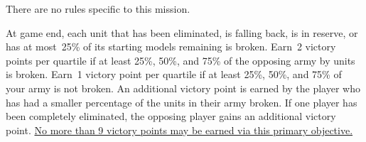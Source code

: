 

\begin{tablesetup}    
  \hammerandanvil
\end{tablesetup}

\begin{missionrules}

\bigskip
There are no rules specific to this mission.

\end{missionrules}


\begin{scoring}
  
\begin{primaries}
  At game end, each unit that has been eliminated, is falling back, is
  in reserve, or has at most~25\% of its starting models remaining is
  broken.  Earn~2 victory points per quartile if at least 25\%, 50\%,
  and 75\% of the opposing army by units is broken.  Earn~1 victory
  point per quartile if at least 25\%, 50\%, and 75\% of your army is
  not broken.  An additional victory point is earned by the player who
  has had a smaller percentage of the units in their army broken.  If
  one player has been completely eliminated, the opposing player gains
  an additional victory point.  \underline{No more than 9 victory
    points may be earned via this primary objective.}
\end{primaries}

\end{scoring}
